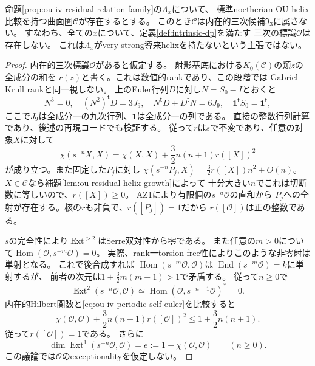 \begin{theorem}[残存IV関係代数族の内在的三次条件からの排除]
\label{thm:ou-iv-periodic-exclusion}
命題\ref{prop:ou-iv-residual-relation-family}の$\Lambda_x$について、
標準noetherian OU helix比較を持つ曲面圏$\mathcal C$が存在するとする。
このとき$\mathcal C$は内在的三次候補$\mathfrak I_3$に属さない。
すなわち、全ての$x$について、定義\ref{def:intrinsic-dp}を満たす
三次の標識$\mathcal O$は存在しない。
これは$\Lambda_x$がvery strong導来helixを持たないという主張ではない。
\end{theorem}
\begin{proof}
内在的三次標識$\mathcal O$があると仮定する。
射影基底における$K_0(\mathcal C)$の類$z$の全成分の和を
$r(z)$と書く。これは数値的rankであり、この段階では
Gabriel--Krull rankと同一視しない。
上のEuler行列$D$に対し$N=S_0-I$とおくと
\begin{equation}\label{eq:ou-iv-periodic-euler}
 N^3=0,\quad
 (N^2)^{\mathsf t}D=3J_9,\quad
 N^{\mathsf t}D+D^{\mathsf t}N=6J_9,\quad
 \mathbf1^{\mathsf t}S_0=\mathbf1^{\mathsf t},
\end{equation}
ここで$J_9$は全成分一の九次行列、$\mathbf1$は全成分一の列である。
直接の整数行列計算であり、後述の再現コードでも検証する。
従って$r$は$s$で不変であり、任意の対象$X$に対して
\begin{equation}\label{eq:ou-iv-periodic-self-euler}
 \chi(s^{-n}X,X)=\chi(X,X)+\frac32 n(n+1)r([X])^2
\end{equation}
が成り立つ。また固定した$P_j$に対し
$\chi(s^{-n}P_j,X)=\frac32 r([X])n^2+O(n)$。
$X\in\mathcal C$なら補題\ref{lem:ou-residual-helix-growth}によって
十分大きい$n$でこれは切断数に等しいので、$r([X])\geq0$。
AZ1により有限個の$s^{-a}\mathcal O$の直和から
$P_j$への全射が存在する。核の$r$も非負で、$r([P_j])=1$だから
$r([\mathcal O])$は正の整数である。

$s$の完全性により$\operatorname{Ext}^{>2}$はSerre双対性から零である。
また任意の$m>0$について$\operatorname{Hom}(\mathcal O,s^{-m}\mathcal O)=0$。
実際、rank一torsion-free性によりこのような非零射は単射となる。
これで後合成すれば
$\operatorname{Hom}(s^{-m}\mathcal O,\mathcal O)$は
$\operatorname{End}(s^{-m}\mathcal O)=k$に単射するが、
前者の次元は$1+\frac32 m(m+1)>1$で矛盾する。
従って$n\geq0$で
\[
 \operatorname{Ext}^2(s^{-n}\mathcal O,\mathcal O)
 \simeq\operatorname{Hom}(\mathcal O,s^{-n-1}\mathcal O)^*=0.
\]
内在的Hilbert関数と\eqref{eq:ou-iv-periodic-self-euler}を比較すると
\[
 \chi(\mathcal O,\mathcal O)+\frac32n(n+1)r([\mathcal O])^2
 \leq 1+\frac32 n(n+1).
\]
従って$r([\mathcal O])=1$である。
さらに
\begin{equation}\label{eq:ou-iv-periodic-ext-self-bound}
 \dim\operatorname{Ext}^1(s^{-n}\mathcal O,\mathcal O)
   =e:=1-\chi(\mathcal O,\mathcal O)\qquad(n\geq0).
\end{equation}
この議論では$\mathcal O$のexceptionalityを仮定しない。


\end{proof}
